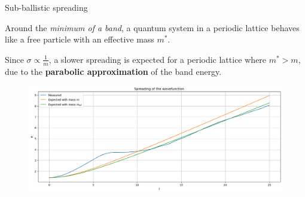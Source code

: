 \begin{frame}{Sub-ballistic spreading}
    \small

    Around the \textit{minimum of a band}, a quantum system in a periodic lattice behaves like a free particle with an effective mass $m^*$.

    \vfill

    Since $\sigma\propto\frac{1}{m}$, a slower spreading is expected for a periodic lattice where $m^*>m$, due to the \textbf{parabolic approximation} of the band energy.

    \vfill

    \begin{figure}[H]
        \centering
        \includegraphics[width=\textwidth]{Immagini/plot-effective-mass.png}
    \end{figure}

    \normalsize
\end{frame}

